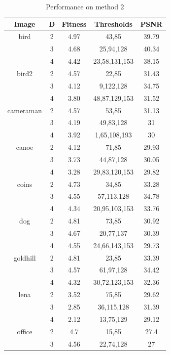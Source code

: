 \documentclass[conference]{IEEEtran}
\begin{document}
\begin{table}[htbp]
\caption{Performance on method 2}
\begin{center}
\begin{tabular}{|c|c|c|c|c|}
    \hline
    Image & D & Fitness  & Thresholds & PSNR \\
    \hline
    bird & 2 & 4.97 & 43,85 & 39.79\\
    \hline
    & 3 & 4.68 & 25,94,128 & 40.34\\
    \hline
    & 4 & 4.42 & 23,58,131,153 & 38.15\\
    \hline
    bird2 & 2 & 4.57 & 22,85 & 31.43\\
    \hline
    & 3 & 4.12 & 9,122,128 & 34.75\\
    \hline
    & 4 & 3.80 & 48,87,129,153 & 31.52\\
    \hline
    cameraman & 2 & 4.57 & 53,85 & 31.13\\
    \hline
    & 3 & 4.19 & 49,83,128 & 31\\
    \hline
    & 4 & 3.92 & 1,65,108,193 & 30\\
    \hline
    canoe & 2 & 4.12 & 71,85 & 29.93\\
    \hline
    & 3 & 3.73 & 44,87,128 & 30.05\\
    \hline
    & 4 & 3.28 & 29,83,120,153 & 29.82\\
    \hline
    coins & 2 & 4.73 & 34,85 & 33.28\\
    \hline
    & 3 & 4.55 & 57,113,128 & 34.78\\
    \hline
    & 4 & 4.34 & 20,95,103,153 & 33.76\\
    \hline
    dog & 2 & 4.81 & 73,85 & 30.92\\
    \hline
    & 3 & 4.67 & 20,77,137 & 30.39\\
    \hline
    & 4 & 4.55 & 24,66,143,153 & 29.73\\
    \hline
    goldhill & 2 & 4.81 & 23,85 & 33.39\\
    \hline
    & 3 & 4.57 & 61,97,128 & 34.42\\
    \hline
    & 4 & 4.32 & 30,72,123,153 & 32.36\\
    \hline
    lena & 2 & 3.52 & 75,85 & 29.62\\
    \hline
    & 3 & 2.85 & 36,115,128 & 31.39\\
    \hline
    & 4 & 2.12 & 13,75,129 & 29.12\\
    \hline
    office & 2 & 4.7 & 15,85 & 27.4\\
    \hline
    & 3 & 4.56 & 22,74,128 & 27\\

\end{tabular}
\end{center}
\end{table}
\end{document}

